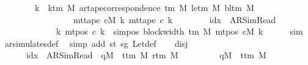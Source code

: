 \begin{isabellebody}
\ \ \ \ \ \ \ {\isasymand}\ {\isacharparenleft}{\kern0pt}{\isasymforall}k\ {\isacharless}{\kern0pt}\ k{\isacharunderscore}{\kern0pt}tm\ M{\isachardot}{\kern0pt}\ ar{\isacharunderscore}{\kern0pt}tape{\isacharunderscore}{\kern0pt}correspondence\ {\isacharparenleft}{\kern0pt}{\isasymGamma}{\isacharunderscore}{\kern0pt}tm\ M{\isacharparenright}{\kern0pt}\ {\isacharparenleft}{\kern0pt}le{\isacharunderscore}{\kern0pt}tm\ M{\isacharparenright}{\kern0pt}\ {\isacharparenleft}{\kern0pt}bl{\isacharunderscore}{\kern0pt}tm\ M{\isacharparenright}{\kern0pt}\isanewline
\ \ \ \ \ \ \ \ \ \ \ \ \ \ \ \ \ {\isacharparenleft}{\kern0pt}mt{\isacharunderscore}{\kern0pt}tape\ cM\ k{\isacharparenright}{\kern0pt}\ {\isacharparenleft}{\kern0pt}mt{\isacharunderscore}{\kern0pt}tape\ c{\isacharprime}{\kern0pt}\ k{\isacharparenright}{\kern0pt}{\isacharparenright}{\kern0pt}\isanewline
\ \ \ \ \ \ \ {\isasymand}\ {\isacharparenleft}{\kern0pt}idx\ {\isacharequal}{\kern0pt}\ AR{\isacharunderscore}{\kern0pt}SimRead\isanewline
\ \ \ \ \ \ \ \ \ \ \ \ {\isasymlongrightarrow}\ {\isacharparenleft}{\kern0pt}{\isasymforall}k{\isachardot}{\kern0pt}\ mt{\isacharunderscore}{\kern0pt}pos\ c{\isacharprime}{\kern0pt}\ k\ {\isacharequal}{\kern0pt}\ sim{\isacharunderscore}{\kern0pt}pos\ {\isacharparenleft}{\kern0pt}block{\isacharunderscore}{\kern0pt}width\ {\isacharparenleft}{\kern0pt}{\isasymGamma}{\isacharunderscore}{\kern0pt}tm\ M{\isacharparenright}{\kern0pt}{\isacharparenright}{\kern0pt}\ {\isacharparenleft}{\kern0pt}mt{\isacharunderscore}{\kern0pt}pos\ cM\ k{\isacharparenright}{\kern0pt}{\isacharparenright}{\kern0pt}{\isacharparenright}{\kern0pt}{\isachardoublequoteclose}\isanewline
\ \ \ \ \isamarkupfalse%
\ sim\ \isamarkupfalse%
\ ar{\isacharunderscore}{\kern0pt}simulates{\isacharunderscore}{\kern0pt}def\ \isamarkupfalse%
\ {\isacharparenleft}{\kern0pt}simp\ add{\isacharcolon}{\kern0pt}\ st\ sg\ Let{\isacharunderscore}{\kern0pt}def{\isacharparenright}{\kern0pt}\isanewline
\ \ \isamarkupfalse%
\ disj{\isacharcolon}{\kern0pt}\isanewline
\ \ \ \ \ \ {\isachardoublequoteopen}{\isacharparenleft}{\kern0pt}idx\ {\isacharequal}{\kern0pt}\ AR{\isacharunderscore}{\kern0pt}SimRead\ {\isasymand}\ qM{\isacharprime}{\kern0pt}\ {\isasymnotin}\ {\isacharbraceleft}{\kern0pt}t{\isacharunderscore}{\kern0pt}tm\ M{\isacharcomma}{\kern0pt}\ r{\isacharunderscore}{\kern0pt}tm\ M{\isacharbraceright}{\kern0pt}{\isacharparenright}{\kern0pt}\isanewline
\ \ \ \ \ \ \ \ {\isasymor}\ {\isacharparenleft}{\kern0pt}qM{\isacharprime}{\kern0pt}\ {\isacharequal}{\kern0pt}\ t{\isacharunderscore}{\kern0pt}tm\ M\isanewline

\end{isabellebody}
